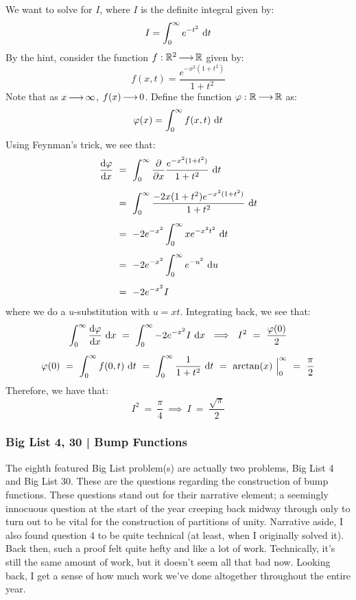 \begin{soln}
    We want to solve for $ I $, where $ I $ is the definite integral given by:
    \begin{equation*}
        I = \int_{0}^{\infty}e^{-t^{2}}\textrm{ d} t
    \end{equation*}
    By the hint, consider the function $ f:\mathbb{R}^{2}\operatorname{\longrightarrow}\mathbb{R} $ given by:
    \begin{equation*}
        f(x,t) = \frac{e^{-x^{2}(1+t^{2})}}{1+t^{2}}
    \end{equation*}
    Note that as $ x \operatorname{\longrightarrow} \infty $, $ f(x) \operatorname{\longrightarrow} 0 $.
    Define the function $ \operatorname{\varphi}:\mathbb{R}\operatorname{\longrightarrow}\mathbb{R} $ as:
    \begin{equation*}
        \operatorname{\varphi}(x) = \int_{0}^{\infty}f(x,t)\textrm{ d} t
    \end{equation*}
    Using Feynman's trick, we see that:
    \begin{align*}
        \frac{\d\!\vphi}{\d x} \ & = \ \int_{0}^{\infty} \frac{\p}{\p x}
        \frac{e^{-x^{2}(1+t^{2})}} {1+t^{2}} \di t \vsp
        & = \ \int_{0}^{\infty}\frac{-2x(1+t^{2})e^{-x^{2}(1+t^{2})}}{1+t^{2}}
        \di t \vsp
        & = \ -2e^{-x^{2}}\int_{0}^{\infty} xe^{-x^{2}t^{2}} \di t \vsp
        & = \ -2e^{-x^{2}}\int_{0}^{\infty}e^{-u^{2}}\di u \vsp
        & = \ -2e^{-x^{2}}I
    \end{align*}
    where we do a $ u $-substitution with $ u = xt $.
    Integrating back, we see that:
    \begin{gather*}
        \int_{0}^{\infty} \frac{\d\!\vphi}{\d x}\di x \ = \ \int_{0}^{\infty}
        -2e^{-x^{2}}I\di x \ \implies \ I^{2} \ = \ \frac{\vphi(0)}{2} \vsp
        \vphi(0) \ = \ \int_{0}^{\infty}f(0,t)\di t \ = \ \int_{0}^{\infty}
        \frac{1}{1+t^{2}} \di t \ = \ \arctan(x) \ \Big|_{0}^{\infty} \ = \
        \frac{\pi}{2}
    \end{gather*}
    Therefore, we have that:
    \begin{equation*}
        I^{2} \ = \ \frac{\pi}{4} \ \implies \ I \ = \ \frac{\sqrt{\pi}}{2}
    \end{equation*}
\end{soln}

\newpage
\subsubsection{Big List 4, 30 | Bump Functions}

The eighth featured Big List problem(s) are actually two problems, Big List 4
and Big List 30. These are the questions regarding the construction of bump
functions. These questions stand out for their narrative element; a seemingly
innocuous question at the start of the year creeping back midway through only to
turn out to be vital for the construction of partitions of unity. Narrative
aside, I also found question 4 to be quite technical (at least, when I
originally solved it). Back then, such a proof felt quite hefty and like a lot
of work. Technically, it's still the same amount of work, but it doesn't seem
all that bad now. Looking back, I get a sense of how much work we've done
altogether throughout the entire year.

